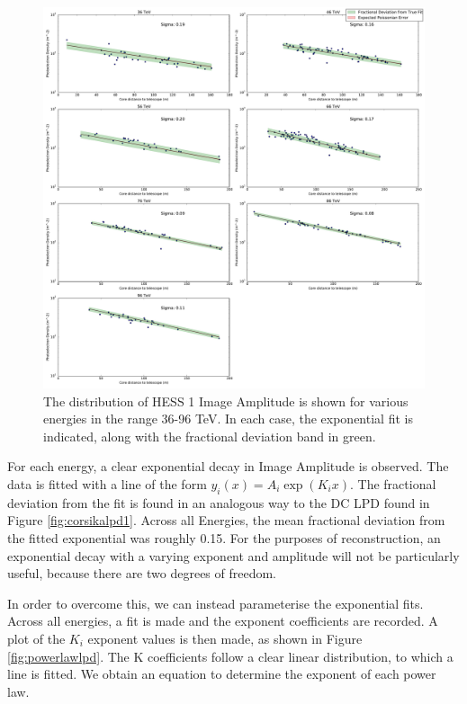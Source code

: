 \documentclass[11pt]{article}
\begin{document}
\begin{figure}
\begin{center}
\includegraphics[width=\textwidth]{corsikafullshowerlpd}
\caption{The distribution of HESS 1 Image Amplitude is shown for various energies in the range 36-96 TeV. In each case, the exponential fit is indicated, along with the fractional deviation band in green.}
\label{fig:fullshowerlpd}
\end{center}
\end{figure}

For each energy, a clear exponential decay in Image Amplitude is observed. The data is fitted with a line of the form $y_{i} (x) =A_{i} \exp (K_{i} x)$. The fractional deviation from the fit is found in an analogous way to the DC LPD found in Figure \ref{fig:corsikalpd1}. Across all Energies, the mean fractional deviation from the fitted exponential was roughly 0.15. For the purposes of reconstruction, an exponential decay with a varying exponent and amplitude will not be particularly useful, because there are two degrees of freedom.

In order to overcome this, we can instead parameterise the exponential fits. Across all energies, a fit is made and the exponent coefficients are recorded. A plot of the $K_{i}$ exponent values is then made, as shown in Figure  \ref{fig:powerlawlpd}. The K coefficients follow a clear linear distribution, to which a line is fitted. We obtain an equation to determine the exponent of each power law. 
\end{document}
